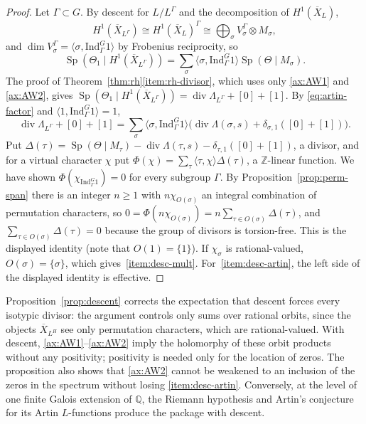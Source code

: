\documentclass[11pt]{amsart}
\theoremstyle{plain}
\theoremstyle{definition}
\theoremstyle{remark}
\numberwithin{equation}{section}
\newcommand{\Q}{\mathbb{Q}}
\newcommand{\Z}{\mathbb{Z}}
\newcommand{\Xbar}{\overline{X}}
\DeclareMathOperator{\divisor}{div}
\begin{document}
\begin{proof}
Let $\Gamma\subset G$. By descent for $L/L^\Gamma$ and the decomposition of
$H^1(\Xbar_L)$,
\[
H^1(\Xbar_{L^\Gamma})\cong H^1(\Xbar_L)^\Gamma\cong
\bigoplus_\sigma V_\sigma^\Gamma\otimes M_\sigma,
\]
and $\dim V_\sigma^\Gamma=\langle\sigma,\mathrm{Ind}_\Gamma^G1\rangle$ by
Frobenius reciprocity, so
\[
\operatorname{Sp}(\Theta_1\mid H^1(\Xbar_{L^\Gamma}))=\sum_\sigma\langle\sigma,
\mathrm{Ind}_\Gamma^G1\rangle\operatorname{Sp}(\Theta\mid M_\sigma).
\]
The proof of Theorem~\ref{thm:rh}\ref{item:rh-divisor}, which uses
only \ref{ax:AW1} and \ref{ax:AW2}, gives
$\operatorname{Sp}(\Theta_1\mid H^1(\Xbar_{L^\Gamma}))
=\divisor\Lambda_{L^\Gamma}
+[0]+[1]$.
By \eqref{eq:artin-factor} and $\langle1,\mathrm{Ind}_\Gamma^G1\rangle=1$,
\[
\divisor\Lambda_{L^\Gamma}+[0]+[1]=\sum_\sigma\langle\sigma,
\mathrm{Ind}_\Gamma^G1\rangle\bigl(\divisor\Lambda(\sigma,s)+
\delta_{\sigma,1}([0]+[1])\bigr).
\]
Put $\Delta(\tau)=\operatorname{Sp}(\Theta\mid M_\tau)-\divisor
\Lambda(\tau,s)-\delta_{\tau,1}([0]+[1])$, a divisor, and for a virtual
character $\chi$ put $\Phi(\chi)=\sum_\tau\langle\tau,\chi\rangle
\Delta(\tau)$, a $\Z$-linear function. We have shown
$\Phi(\chi_{\mathrm{Ind}_\Gamma^G1})=0$ for every subgroup $\Gamma$. By
Proposition~\ref{prop:perm-span} there is an integer $n\ge1$ with
$n\chi_{O(\sigma)}$ an integral combination of permutation characters,
so $0=\Phi(n\chi_{O(\sigma)})=n\sum_{\tau\in O(\sigma)}\Delta(\tau)$,
and $\sum_{\tau\in O(\sigma)}\Delta(\tau)=0$ because the group of
divisors is torsion-free. This is the displayed identity (note that
$O(1)=\{1\}$). If $\chi_\sigma$ is rational-valued, $O(\sigma)=
\{\sigma\}$, which gives~\ref{item:desc-mult}. For~\ref{item:desc-artin},
the left side of the displayed identity is effective.
\end{proof}

Proposition~\ref{prop:descent} corrects the expectation that descent
forces every isotypic divisor: the argument controls only sums over
rational orbits, since the objects $\Xbar_{L^H}$ see only permutation
characters, which are rational-valued. With descent,
\ref{ax:AW1}--\ref{ax:AW2} imply the holomorphy of these orbit products
without any positivity; positivity is needed only for the location of
zeros. The proposition also shows that \ref{ax:AW2} cannot be weakened
to an inclusion of the zeros in the spectrum without losing
\ref{item:desc-artin}. Conversely, at the level of one finite Galois
extension of $\Q$, the Riemann hypothesis and Artin's conjecture for its
Artin $L$-functions produce the package with descent.
\end{document}

